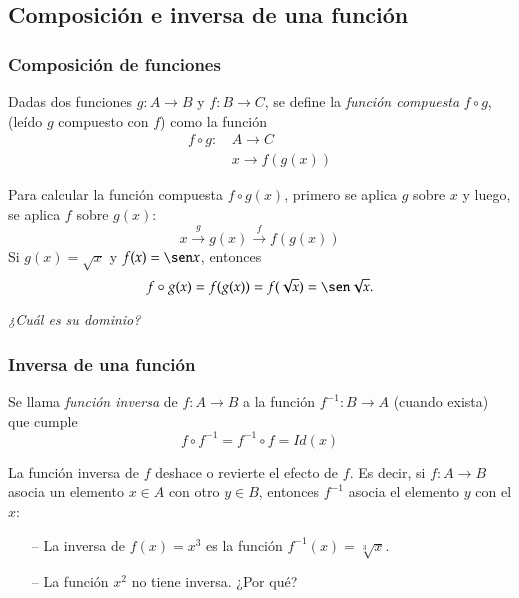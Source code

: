 	\subsection{Composición e inversa de una función}
	\begin{frame}
		\frametitle{Composición de funciones}
		\begin{definicion}
			Dadas dos funciones $g:A\rightarrow B$ y $f:B\rightarrow C$, se define la \emph{función compuesta} $f\circ g$, (leído $g$ compuesto con $f$) como la función  
			\begin{align*}
				f\circ g:\, & A\longrightarrow C       \\
				            & x\longrightarrow f(g(x)) 
			\end{align*}
		\end{definicion}
		Para calcular la función compuesta $f\circ g(x)$, primero se aplica $g$ sobre $x$ y luego, se aplica $f$ sobre $g(x)$:
		\[
			x\stackrel{g}{\longrightarrow}g(x)\stackrel{f}{\longrightarrow}f(g(x))
		\]
		 Si $g(x)=\sqrt x$ y $f(x)=\sen x$, entonces 
		\[
			f\circ g(x)=f(g(x))=f(\sqrt x)=\sen \sqrt x.
		\]
		\begin{center}
			\emph{¿Cuál es su dominio?}
		\end{center}
	\end{frame} 
	
	
	\begin{frame}
		\frametitle{Inversa de una función}
		\begin{definicion}
			Se llama \emph{función inversa} de $f:A\rightarrow B$ a la función $f^{-1}:B\rightarrow A$ (cuando exista) que cumple
			\[
				f\circ f^{-1}=f^{-1}\circ f=Id(x)
			\]
		\end{definicion}
		
		La función inversa de $f$ deshace o revierte el efecto de $f$. 
		Es decir, si $f:A\rightarrow B$ asocia un elemento $x\in A$ con otro $y\in B$,
		entonces $f^{-1}$ asocia el elemento $y$ con el $x$: 
		\begin{center}
			\scalebox{1}{}
		\end{center}
		
		\structure{\textbf{Ejemplo}}
		\begin{itemize}
			\item[--] La inversa de $f(x)=x^3$ es la función $f^{-1}(x)=\sqrt[3]{x}.$ 
			\item[--] La función $x^2$ no tiene inversa. ¿Por qué?
		\end{itemize}
	\end{frame} 
	
